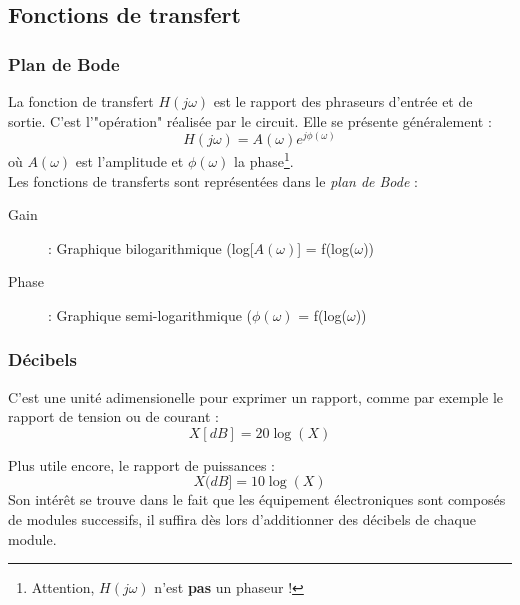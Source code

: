 \subsection{Fonctions de transfert}
\subsubsection{Plan de Bode}
La fonction de transfert $H(j\omega)$ est le rapport des phraseurs d'entrée et de sortie. C'est l'"opération" réalisée par le circuit. Elle se présente généralement :
\begin{equation}
	H(j\omega) = A(\omega)e^{j\phi(\omega)}
\end{equation}
où $A(\omega)$ est l'amplitude et $\phi(\omega)$ la phase\footnote{Attention, $H(j\omega)$ n'est \textbf{pas} un phaseur !}.\\

Les fonctions de transferts sont représentées dans le \textit{plan de Bode} :
\begin{description}
	\item[Gain] : Graphique bilogarithmique (log[$A(\omega)$] = f(log($\omega$))
	\item[Phase]: Graphique semi-logarithmique ($\phi(\omega)$ = f(log($\omega$))
\end{description}

\subsubsection{Décibels}
C'est une unité adimensionelle pour exprimer un rapport, comme par exemple le rapport de tension ou de courant :
\begin{equation}
	X[dB] = 20\log(X)
\end{equation}

Plus utile encore, le rapport de puissances :
\begin{equation}
	X(dB] = 10\log(X)
\end{equation}
Son intérêt se trouve dans le fait que les équipement électroniques sont composés de modules successifs, il suffira dès lors d'additionner des décibels de chaque module.